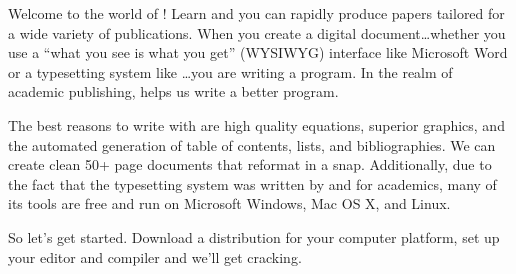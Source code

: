 

\begin{preface}
Welcome to the world of \Latex! Learn \Latex and you can rapidly
produce papers tailored for a wide variety of publications.
When you create a digital
document\ldots whether you use a ``what you see is what you get''
(WYSIWYG) interface like Microsoft Word or a typesetting system like
\Latex\ldots you are writing a program.  In the realm of academic publishing,
\Latex helps us write a better program.   

The best reasons to write with \Latex are high quality equations,
superior graphics, and the automated generation of table of contents,
lists, and bibliographies.  We can create clean 50+ page documents
that reformat in a snap.  Additionally, due to the fact that the
\Latex typesetting system was written by and for academics, many
of its tools are free and run on Microsoft Windows, Mac OS X, and
Linux.

So let's get started.  Download a \Latex distribution for 
your computer platform, set up your editor and compiler and we'll get 
cracking.  
\end{preface}


